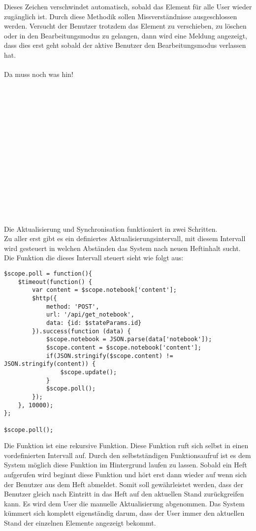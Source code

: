 Dieses Zeichen verschwindet automatisch, sobald das Element für alle User wieder zugänglich ist. Durch diese Methodik sollen Missverständnisse ausgeschlossen werden. Versucht der Benutzer trotzdem das Element zu verschieben, zu löschen oder in den Bearbeitungsmodus zu gelangen, dann wird eine Meldung angezeigt, dass dies erst geht sobald der aktive Benutzer den Bearbeitungsmodus verlassen hat. \\
\\
Da muss noch was hin!
\\\\\\\\\\\\\\\\\\\\\\\\\\\\\\\\
Die Aktualisierung und Synchronisation funktioniert in zwei Schritten.\\
Zu aller erst gibt es ein definiertes Aktualisierungsintervall, mit diesem Intervall wird gesteuert in welchen Abständen das System nach neuen Heftinhalt sucht. Die Funktion die dieses Intervall steuert sieht wie folgt aus:
\begin{lstlisting}[caption={Aktualisierung - PWS}]
$scope.poll = function(){
    $timeout(function() {
        var content = $scope.notebook['content'];
        $http({
            method: 'POST',
            url: '/api/get_notebook',
            data: {id: $stateParams.id}
        }).success(function (data) {
            $scope.notebook = JSON.parse(data['notebook']);
            $scope.content = $scope.notebook['content'];
            if(JSON.stringify($scope.content) != JSON.stringify(content)) {
                $scope.update();
            }
            $scope.poll();
        });
    }, 10000);
};

$scope.poll();
\end{lstlisting}
Die Funktion ist eine rekursive Funktion. Diese Funktion ruft sich selbst in einen vordefinierten Intervall auf. Durch den selbstständigen Funktionsaufruf ist es dem System möglich diese Funktion im Hintergrund laufen zu lassen. Sobald ein Heft aufgerufen wird beginnt diese Funktion und hört erst dann wieder auf wenn sich der Benutzer aus dem Heft abmeldet. Somit soll gewährleistet werden, dass der Benutzer gleich nach Eintritt in das Heft auf den aktuellen Stand zurückgreifen kann. Es wird dem User die manuelle Aktualisierung abgenommen. Das System kümmert sich komplett eigenständig darum, dass der User immer den aktuellen Stand der einzelnen Elemente angezeigt bekommt. \\
